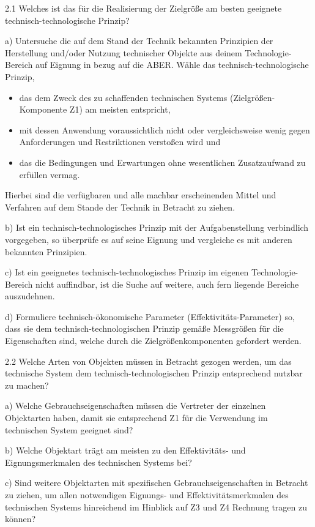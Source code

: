 \documentclass[12pt,a4paper]{article}
\begin{document}
2.1 Welches ist das für die Realisierung der Zielgröße am besten geeignete
technisch-technologische Prinzip?

a) Untersuche die auf dem Stand der Technik bekannten Prinzipien der
Herstellung und/oder Nutzung technischer Objekte aus deinem Technologie-Bereich
auf Eignung in bezug auf die ABER. Wähle das technisch-technologische Prinzip,
\begin{itemize}
  \item das dem Zweck des zu schaffenden technischen Systems
    (Zielgrößen-Komponente Z1) am meisten entspricht, 
  \item mit dessen Anwendung voraussichtlich nicht oder vergleichsweise wenig
    gegen Anforderungen und Restriktionen verstoßen wird und
  \item das die Bedingungen und Erwartungen ohne wesentlichen Zusatzaufwand zu
    erfüllen vermag.
\end{itemize}
Hierbei sind die verfügbaren und alle machbar erscheinenden Mittel und
Verfahren auf dem Stande der Technik in Betracht zu ziehen.

b) Ist ein technisch-technologisches Prinzip mit der Aufgabenstellung
verbindlich vorgegeben, so überprüfe es auf seine Eignung und vergleiche es mit
anderen bekannten Prinzipien.

c) Ist ein geeignetes technisch-technologisches Prinzip im eigenen
Technologie-Bereich nicht auffindbar, ist die Suche auf weitere, auch fern
liegende Bereiche auszudehnen.

d) Formuliere technisch-ökonomische Parameter (Effektivitäts-Parameter) so,
dass sie dem technisch-technologischen Prinzip gemäße Messgrößen für die
Eigenschaften sind, welche durch die Zielgrößenkomponenten gefordert werden.

2.2 Welche Arten von Objekten müssen in Betracht gezogen werden, um das
technische System dem technisch-technologischen Prinzip entsprechend nutzbar zu
machen?

a) Welche Gebrauchseigenschaften müssen die Vertreter der einzelnen Objektarten
haben, damit sie entsprechend Z1 für die Verwendung im technischen System
geeignet sind?

b) Welche Objektart trägt am meisten zu den Effektivitäts- und
Eignungsmerkmalen des technischen Systems bei?

c) Sind weitere Objektarten mit spezifischen Gebrauchseigenschaften in Betracht
zu ziehen, um allen notwendigen Eignungs- und Effektivitätsmerkmalen des
technischen Systems hinreichend im Hinblick auf Z3 und Z4 Rechnung tragen zu
können?
\end{document}
